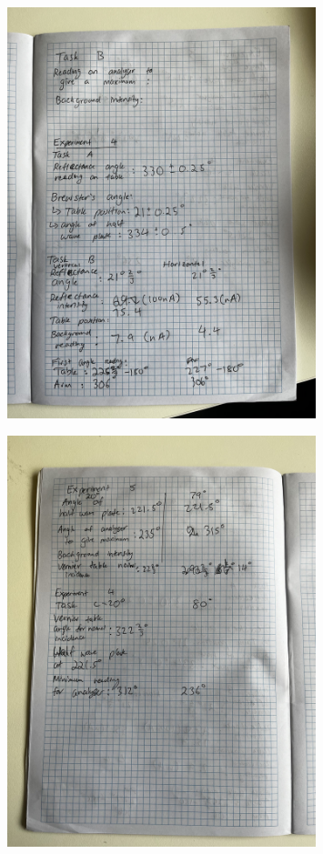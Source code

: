 \documentclass{article}
\begin{document}
\begin{figure}[H]
    \centering
    \includegraphics[width=0.8\textwidth,angle=270,origin=c]{labbook11.jpg}
\end{figure}

\begin{figure}[H]
    \centering
    \includegraphics[width=0.8\textwidth,angle=270,origin=c]{labbook12.jpg}
\end{figure}
\end{document}
